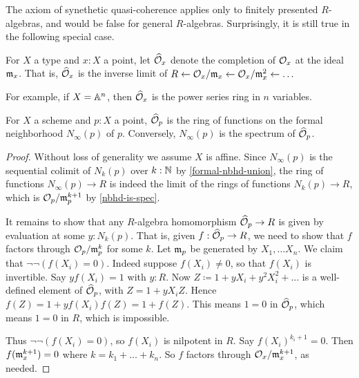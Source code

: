 The axiom of synethetic quasi-coherence applies only to finitely presented $R$-algebras,
and would be false for general $R$-algebras. Surprisingly, it is still true in 
the following special case.
\begin{definition} 
For $X$ a type and $x : X$ a point, let $\widehat {\mathcal{O}}_x$ denote the
completion of $\mathcal{O}_x$ at the ideal $\mathfrak{m}_x$. That is, $\widehat {\mathcal{O}}_x$ is 
the inverse limit of 
$R \leftarrow \mathcal{O}_x / \mathfrak{m}_x \leftarrow \mathcal{O}_x / \mathfrak{m}_x^2 \leftarrow \ldots$
\end{definition}
For example, if $X = \mathbb{A}^n$, then $\widehat {\mathcal{O}}_x$ is the power series ring
in $n$ variables.
\begin{lemma}%
For $X$ a scheme and $p : X$ a point, $\widehat {\mathcal{O}}_p$ is the ring of functions
on the formal neighborhood $N_\infty(p)$ of $p$. Conversely,
$N_\infty(p)$ is the spectrum of $\widehat {\mathcal{O}}_p$.
\end{lemma}
\begin{proof}
Without loss of generality we assume $X$ is affine. Since $N_\infty(p)$ is the
sequential colimit of $N_k(p)$ over $k : \mathbb{N} $ by \cref{formal-nbhd-union}, the
ring of functions $N_\infty(p) \to R$ is indeed the limit of the rings of
functions $N_k(p) \to R$, which is $\mathcal{O}_p / \mathfrak{m}_p^{k+1}$ by \cref{nbhd-is-spec}.

It remains to show that any $R$-algebra homomorphism $\widehat {\mathcal{O}}_p \to R$
is given by evaluation at some $y : N_k(p)$. That is, given
$f : \widehat {\mathcal{O}}_p \to R$, we need to show that $f$ factors through
$\mathcal{O}_p / \mathfrak{m}_p^k$ for some $k$.
Let $\mathfrak{m}_p$ be generated by $X_1, \ldots X_n$.
We claim that $\neg \neg (f(X_i) = 0)$.
Indeed suppose $f(X_i) \ne 0$, so that $f(X_i)$ is invertible. Say
$yf(X_i) = 1$ with $y : R$. Now $Z \coloneqq 1 + yX_i + y^2X_i^2 + \ldots$
is a well-defined element of $\widehat {\mathcal{O}}_p$, with
$Z = 1 + yX_i Z$. Hence $f(Z) = 1 + y f(X_i)f(Z) = 1 + f(Z)$.
This means $1 = 0$ in $\widehat {\mathcal{O}}_p$, which means $1 = 0$ in $R$, which is impossible.

Thus $\neg \neg (f(X_i) = 0)$, so $f(X_i)$ is nilpotent in $R$.
Say $f(X_i)^{k_i+1} = 0$. Then $f(\mathfrak{m}_x^{k+1}) = 0$ where $k = k_1 + \ldots + k_n$.
So $f$ factors through $\mathcal{O}_x / \mathfrak{m}_x^{k+1}$, as needed.
\end{proof}
